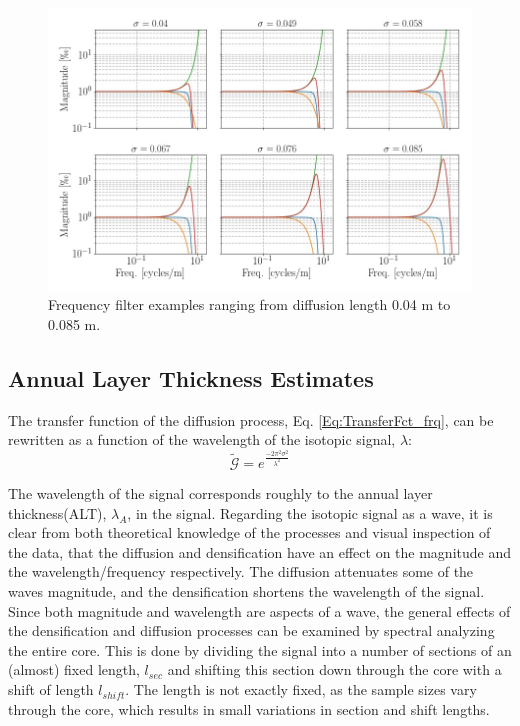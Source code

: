 \documentclass[../../CompleteThesis2/Complete_2ndDraft]{subfiles}
\begin{document}
\begin{figure}[h]
	\centering
	\includegraphics[width=\textwidth]{SiteA_filtersEx.jpg}
	\caption[Frequency filters example, Site A]{\small Frequency filter examples ranging from diffusion length 0.04 m to 0.085 m.}
	\label{fig:SiteA_filtersEx}
\end{figure}


\subsection[ALT from Spectral Analysis]{Annual Layer Thickness Estimates}
\label{Subsubsec:SignalAnalysis_SpectralAnalysis_ALT}

The transfer function of the diffusion process, Eq. \ref{Eq:TransferFct_frq}, can be rewritten as a function of the wavelength of the isotopic signal, $\lambda$:
\begin{equation}
	\tilde{\mathcal{G}} = e^{\frac{-2\pi^2\sigma^2}{\lambda^2}}
	\label{Eq:TransferFct_lambda}
\end{equation}

The wavelength of the signal corresponds roughly to the annual layer thickness(ALT), $\lambda_A$, in the signal. Regarding the isotopic signal as a wave, it is clear from both theoretical knowledge of the processes and visual inspection of the data, that the diffusion and densification have an effect on the magnitude and the wavelength/frequency respectively. The diffusion attenuates some of the waves magnitude, and the densification shortens the wavelength of the signal. Since both magnitude and wavelength are aspects of a wave, the general effects of the densification and diffusion processes can be examined by spectral analyzing the entire core. This is done by dividing the signal into a number of sections of an (almost) fixed length, $l_{sec}$ and shifting this section down through the core with a shift of length $l_{shift}$. The length is not exactly fixed, as the sample sizes vary through the core, which results in small variations in section and shift lengths.
\end{document}
